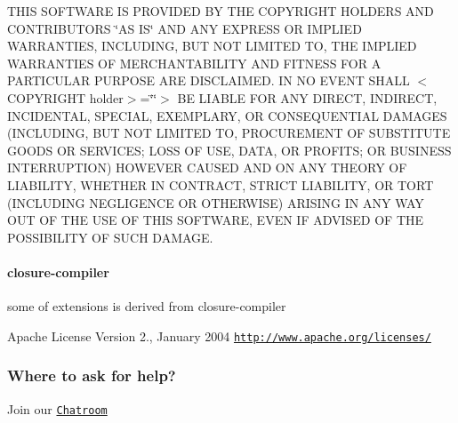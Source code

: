 T\+H\+IS S\+O\+F\+T\+W\+A\+RE IS P\+R\+O\+V\+I\+D\+ED BY T\+HE C\+O\+P\+Y\+R\+I\+G\+HT H\+O\+L\+D\+E\+RS A\+ND C\+O\+N\+T\+R\+I\+B\+U\+T\+O\+RS \char`\"{}\+A\+S I\+S\char`\"{} A\+ND A\+NY E\+X\+P\+R\+E\+SS OR I\+M\+P\+L\+I\+ED W\+A\+R\+R\+A\+N\+T\+I\+ES, I\+N\+C\+L\+U\+D\+I\+NG, B\+UT N\+OT L\+I\+M\+I\+T\+ED TO, T\+HE I\+M\+P\+L\+I\+ED W\+A\+R\+R\+A\+N\+T\+I\+ES OF M\+E\+R\+C\+H\+A\+N\+T\+A\+B\+I\+L\+I\+TY A\+ND F\+I\+T\+N\+E\+SS F\+OR A P\+A\+R\+T\+I\+C\+U\+L\+AR P\+U\+R\+P\+O\+SE A\+RE D\+I\+S\+C\+L\+A\+I\+M\+ED. IN NO E\+V\+E\+NT S\+H\+A\+LL $<$\+C\+O\+P\+Y\+R\+I\+G\+H\+T holder$>$=\char`\"{}\char`\"{}$>$ BE L\+I\+A\+B\+LE F\+OR A\+NY D\+I\+R\+E\+CT, I\+N\+D\+I\+R\+E\+CT, I\+N\+C\+I\+D\+E\+N\+T\+AL, S\+P\+E\+C\+I\+AL, E\+X\+E\+M\+P\+L\+A\+RY, OR C\+O\+N\+S\+E\+Q\+U\+E\+N\+T\+I\+AL D\+A\+M\+A\+G\+ES (I\+N\+C\+L\+U\+D\+I\+NG, B\+UT N\+OT L\+I\+M\+I\+T\+ED TO, P\+R\+O\+C\+U\+R\+E\+M\+E\+NT OF S\+U\+B\+S\+T\+I\+T\+U\+TE G\+O\+O\+DS OR S\+E\+R\+V\+I\+C\+ES; L\+O\+SS OF U\+SE, D\+A\+TA, OR P\+R\+O\+F\+I\+TS; OR B\+U\+S\+I\+N\+E\+SS I\+N\+T\+E\+R\+R\+U\+P\+T\+I\+ON) H\+O\+W\+E\+V\+ER C\+A\+U\+S\+ED A\+ND ON A\+NY T\+H\+E\+O\+RY OF L\+I\+A\+B\+I\+L\+I\+TY, W\+H\+E\+T\+H\+ER IN C\+O\+N\+T\+R\+A\+CT, S\+T\+R\+I\+CT L\+I\+A\+B\+I\+L\+I\+TY, OR T\+O\+RT (I\+N\+C\+L\+U\+D\+I\+NG N\+E\+G\+L\+I\+G\+E\+N\+CE OR O\+T\+H\+E\+R\+W\+I\+SE) A\+R\+I\+S\+I\+NG IN A\+NY W\+AY O\+UT OF T\+HE U\+SE OF T\+H\+IS S\+O\+F\+T\+W\+A\+RE, E\+V\+EN IF A\+D\+V\+I\+S\+ED OF T\+HE P\+O\+S\+S\+I\+B\+I\+L\+I\+TY OF S\+U\+CH D\+A\+M\+A\+GE.

\paragraph*{closure-\/compiler}

some of extensions is derived from closure-\/compiler

Apache License Version 2., January 2004 \href{http://www.apache.org/licenses/}{\tt http\+://www.\+apache.\+org/licenses/}

\subsubsection*{Where to ask for help?}

Join our \href{https://gitter.im/eslint/doctrine}{\tt Chatroom} 